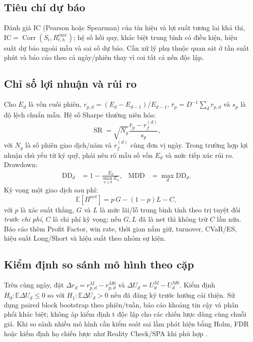 \documentclass[12pt,a4paper,oneside]{article}
\newcommand{\E}{\mathbb{E}}
\newcommand{\Corr}{\operatorname{Corr}}
\newcommand{\SR}{\operatorname{SR}}
\begin{document}
\subsection{Tiêu chí dự báo}
Đánh giá IC (Pearson hoặc Spearman) của tín hiệu và lợi suất tương lai khả thi, $\mathrm{IC}=\Corr(S_t,R_{t,h}^{\mathrm{exec}})$; hệ số hồi quy, khác biệt trung bình có điều kiện, hiệu suất dự báo ngoài mẫu và sai số dự báo. Cần xử lý phụ thuộc quan sát ở tần suất phút và báo cáo theo cả ngày/phiên thay vì coi tất cả nến độc lập.

\subsection{Chỉ số lợi nhuận và rủi ro}
Cho $E_d$ là vốn cuối phiên, $r_{p,d}=(E_d-E_{d-1})/E_{d-1}$, $\bar r_p=D^{-1}\sum_d r_{p,d}$ và $s_p$ là độ lệch chuẩn mẫu. Hệ số Sharpe thường niên hóa:
\begin{equation}
\SR=\sqrt{N_y}\frac{\bar r_p-r_f^{(d)}}{s_p},
\end{equation}
với $N_y$ là số phiên giao dịch/năm và $r_f^{(d)}$ cùng đơn vị ngày. Trong trường hợp lợi nhuận chủ yếu từ ký quỹ, phải nêu rõ mẫu số vốn $E_d$ và mức tiếp xúc rủi ro. Drawdown:
\begin{align}
\mathrm{DD}_d&=1-\frac{E_d}{\max_{u\leq d}E_u},&
\mathrm{MDD}&=\max_d\mathrm{DD}_d.
\end{align}
Kỳ vọng một giao dịch sau phí:
\begin{equation}
\E[\Pi^{net}]=p\,G-(1-p)L-C,
\end{equation}
với $p$ là xác suất thắng, $G$ và $L$ là mức lãi/lỗ trung bình tính theo trị tuyệt đối \emph{trước chi phí}, $C$ là chi phí kỳ vọng; nếu $G,L$ đã là net thì không trừ $C$ lần nữa. Báo cáo thêm Profit Factor, win rate, thời gian nắm giữ, turnover, CVaR/ES, hiệu suất Long/Short và hiệu suất theo nhóm sự kiện.

\subsection{Kiểm định so sánh mô hình theo cặp}
Trên cùng ngày, đặt $\Delta r_d=r_{p,d}^{M}-r_{p,d}^{M0}$ và $\Delta U_d=U_d^{M}-U_d^{M0}$. Kiểm định $H_0:\E\Delta U_d\leq0$ so với $H_1:\E\Delta U_d>0$ nếu đã đăng ký trước hướng cải thiện. Sử dụng paired block bootstrap theo phiên/tuần, báo cáo khoảng tin cậy và phân phối khác biệt; không áp kiểm định t độc lập cho các chiến lược dùng cùng chuỗi giá. Khi so sánh nhiều mô hình cần kiểm soát sai lầm phát hiện bằng Holm, FDR hoặc kiểm định họ chiến lược như Reality Check/SPA khi phù hợp \cite{white2000,hansen2005}.
\end{document}
